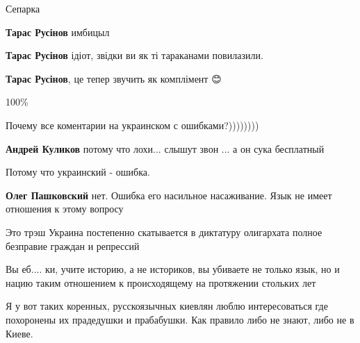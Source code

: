 \begin{itemize}
Сепарка

\begin{itemize}
\textbf{Тарас Русінов} имбицыл🤷

\textbf{Тарас Русінов} ідіот, звідки ви як ті тараканами повилазили.

\textbf{Тарас Русінов}, це тепер звучить як комплімент 😊
\end{itemize}

100\%

\begin{itemize}
Почему все коментарии на украинском с ошибками?))))))))

\textbf{Андрей Куликов} потому что лохи... слышут звон ... а он сука бесплатный

Потому что украинский - ошибка.

\textbf{Олег Пашковский} нет. Ошибка его насильное насаживание. Язык не имеет отношения к этому вопросу
\end{itemize}

Это трэш Украина постепенно скатывается в диктатуру олигархата полное безправие граждан и репрессий


Вы еб.... ки, учите историю, а не историков, вы убиваете не только язык, но и
нацию таким отношением к происходящему на протяжении стольких лет



Я у вот таких коренных, русскоязычных киевлян люблю интересоваться где
похоронены их прадедушки и прабабушки. Как правило либо не знают, либо не в
Киеве.

\end{itemize}

